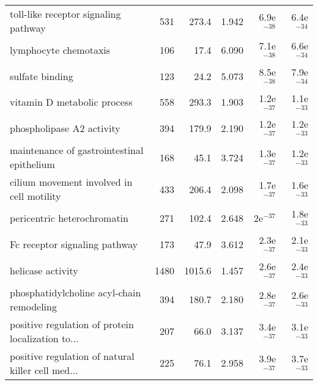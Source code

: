 \begin{longtable}{lrrrrr}
              toll-like receptor signaling pathway &                     531 &                   273.4 &      1.942 &         6.9e$^{-38}$ &         6.4e$^{-34}$ \\
                             lymphocyte chemotaxis &                     106 &                    17.4 &      6.090 &         7.1e$^{-38}$ &         6.6e$^{-34}$ \\
                                   sulfate binding &                     123 &                    24.2 &      5.073 &         8.5e$^{-38}$ &         7.9e$^{-34}$ \\
                       vitamin D metabolic process &                     558 &                   293.3 &      1.903 &         1.2e$^{-37}$ &         1.1e$^{-33}$ \\
                         phospholipase A2 activity &                     394 &                   179.9 &      2.190 &         1.2e$^{-37}$ &         1.2e$^{-33}$ \\
        maintenance of gastrointestinal epithelium &                     168 &                    45.1 &      3.724 &         1.3e$^{-37}$ &         1.2e$^{-33}$ \\
         cilium movement involved in cell motility &                     433 &                   206.4 &      2.098 &         1.7e$^{-37}$ &         1.6e$^{-33}$ \\
                       pericentric heterochromatin &                     271 &                   102.4 &      2.648 &           2e$^{-37}$ &         1.8e$^{-33}$ \\
                     Fc receptor signaling pathway &                     173 &                    47.9 &      3.612 &         2.3e$^{-37}$ &         2.1e$^{-33}$ \\
                                 helicase activity &                    1480 &                  1015.6 &      1.457 &         2.6e$^{-37}$ &         2.4e$^{-33}$ \\
         phosphatidylcholine acyl-chain remodeling &                     394 &                   180.7 &      2.180 &         2.8e$^{-37}$ &         2.6e$^{-33}$ \\
 positive regulation of protein localization to... &                     207 &                    66.0 &      3.137 &         3.4e$^{-37}$ &         3.1e$^{-33}$ \\
 positive regulation of natural killer cell med... &                     225 &                    76.1 &      2.958 &         3.9e$^{-37}$ &         3.7e$^{-33}$ \\

\end{longtable}
